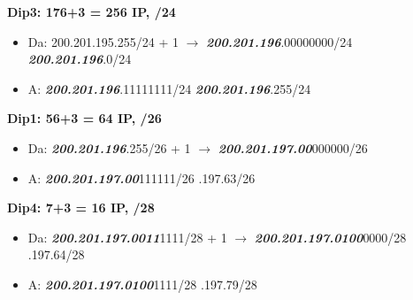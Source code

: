 \documentclass[12pt]{report}
\begin{document}
\begin{tcolorbox}[breakable, title={Esempio di Subnetting}]
	\textbf{Dip3: 176+3 = 256 IP, /24}
	\begin{itemize}
		\item Da: 200.201.195.255/24 + 1 $\rightarrow$ \textbf{\textit{200.201.196}}.00000000/24 \quad \textbf{\textit{200.201.196}}.0/24
		\item A: \textbf{\textit{200.201.196}}.11111111/24 \quad \textbf{\textit{200.201.196}}.255/24
	\end{itemize}

	\textbf{Dip1: 56+3 = 64 IP, /26}
	\begin{itemize}
		\item Da: \textbf{\textit{200.201.196}}.255/26 + 1 $\rightarrow$ \textbf{\textit{200.201.197.00}}000000/26
		\item A: \textbf{\textit{200.201.197.00}}111111/26 .197.63/26
	\end{itemize}

	\textbf{Dip4: 7+3 = 16 IP, /28}
	\begin{itemize}
		\item Da: \textbf{\textit{200.201.197.0011}}1111/28 + 1 $\rightarrow$ \textbf{\textit{200.201.197.0100}}0000/28 .197.64/28
		\item A: \textbf{\textit{200.201.197.0100}}1111/28 .197.79/28
	\end{itemize}
\end{tcolorbox}
\end{document}
